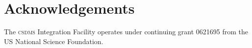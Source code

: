 \documentclass[11pt, oneside]{amsart}
\newcommand{\huttonnote}[1]{ {\textcolor{magenta}    { ***Eric:      #1 }}}
\DeclareRobustCommand{\csdms}{\textsc{csdms}}
\begin{document}
\section{Acknowledgements}

The \csdms{} Integration Facility operates under continuing grant 0621695
from the US National Science Foundation.



{}

\end{document}

